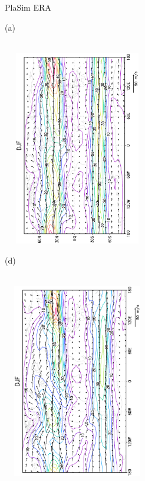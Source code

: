 \documentclass[12pt,a4paper,twoside,openright,headinclude,liststotoc,bibtotoc]{scrreprt}
\begin{document}
\begin{figure}[H]
\hspace{3.8cm}PlaSim \vspace{0.2cm}\hspace{7.1cm} ERA \\
\parbox{8.5cm}{\hspace{0.50cm}\begin{scriptsize}(a)\end{scriptsize} \vspace{-0.7cm} \\
\includegraphics[height=8.5cm,width=6.5cm,angle=-90]
{eps/uv300DJF.eps}
}
\parbox{8.5cm}{\hspace{0.25cm}\begin{scriptsize}(d)\end{scriptsize} \vspace{-0.7cm} \\
\includegraphics[height=8.5cm,width=6.5cm,angle=-90]
{eps/t21uv300DJF.eps}
}
\end{figure}
\end{document}
